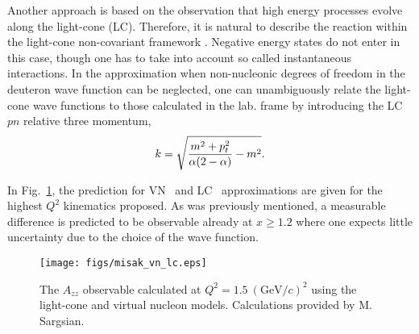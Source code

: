  Another approach is based on the observation that high energy processes
evolve along the light-cone (LC).  Therefore, it is natural to describe the 
reaction within the light-cone non-covariant framework \cite{Frankfurt:1981mk}. 
Negative energy states do not enter in this case, though one has to take into 
account so called instantaneous interactions.
In the approximation when non-nucleonic degrees of freedom in the
deuteron wave function can be neglected, one can unambiguously relate
the light-cone wave functions to those calculated in the lab. frame
by introducing the LC $pn$ relative three momentum,
\begin{equation}
k=\sqrt{{m^2+p_t^2\over \alpha(2-\alpha)} - m^2}.
\end{equation}

In Fig.~\ref{fig:misak}, the prediction for VN~\cite{Sargsian:2009hf} and LC~\cite{Frankfurt:1993sp} approximations are given 
for the highest $Q^2$ kinematics proposed. As was previously mentioned, a measurable 
difference is predicted to be observable already at $x\ge 1.2$ where one expects little uncertainty due 
to the choice of the wave function.  
 
 

\begin{figure}
\begin{center}
\texttt{[image: figs/misak\_vn\_lc.eps]}
\caption{\label{fig:misak} The $A_{zz}$ observable calculated at $Q^2=1.5~(\mathrm{GeV}/c)^2$ using the light-cone and virtual nucleon models. Calculations provided by M. Sargsian.}
\end{center}
\end{figure}

